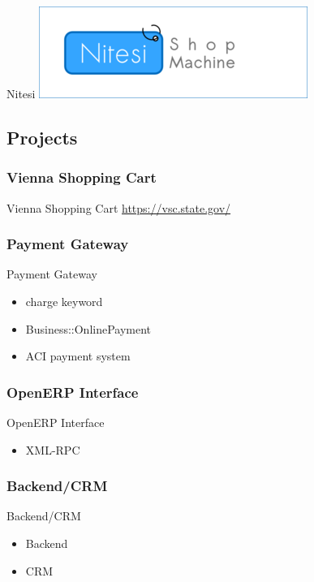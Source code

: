\begin{frame}{Nitesi}
  \includegraphics{nitesi.png}
\end{frame}

\subsection{Projects}
\subsubsection{Vienna Shopping Cart}
\begin{frame}{Vienna Shopping Cart}
\url{https://vsc.state.gov/}
\end{frame}

\subsubsection{Payment Gateway}
\begin{frame}{Payment Gateway}
  \begin{itemize}
  \item charge keyword
  \item Business::OnlinePayment
  \item ACI payment system
  \end{itemize}
\end{frame}

\subsubsection{OpenERP Interface}
\begin{frame}{OpenERP Interface} 
  \begin{itemize}
  \item XML-RPC
  \end{itemize}
\end{frame}

\subsubsection{Backend/CRM}
\begin{frame}{Backend/CRM} 
  \begin{itemize}
  \item Backend
  \item CRM
  \end{itemize}
\end{frame}

